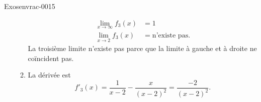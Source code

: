 \begin{corrige}{Exosenvrac-0015}
\begin{enumerate}
\begin{enumerate}
\begin{subequations}
\begin{align}
                    \lim_{x\to \infty} f_3(x)&=1\\
                    \lim_{x\to 2} f_3(x)&=\text{n'existe pas}.
                \end{align}
            \end{subequations}
            La troisième limite n'existe pas parce que la limite à gauche et à droite ne coïncident pas.
                \item
                    La dérivée est 
            \begin{equation}
                f'_3(x)=\frac{1}{ x-2 }-\frac{ x }{ (x-2)^2 }=\frac{ -2 }{ (x-2)^2 }.
            \end{equation}
                    
            \end{enumerate}
           
    \end{enumerate}

\end{corrige}
